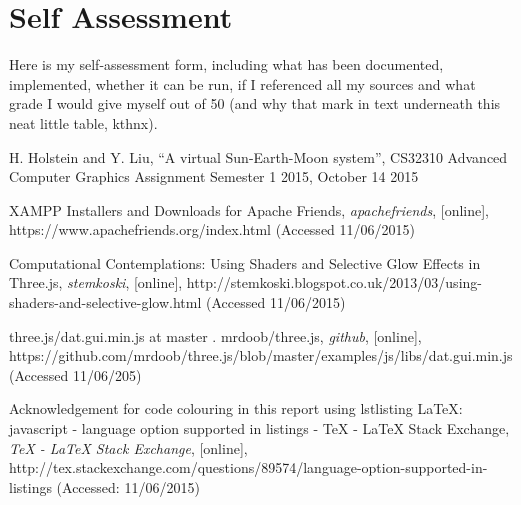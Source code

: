 \documentclass[12pt]{article}
\begin{document}
\clearpage

\section{Self Assessment}
Here is my self-assessment form, including what has been documented, implemented, whether it can be run, if I referenced all my sources and what grade I would give myself out of 50 (and why that mark in text underneath this neat little table, kthnx).


\clearpage


\begin{thebibliography}{1}

 H. Holstein and Y. Liu, ``A virtual Sun-Earth-Moon system'', CS32310 Advanced Computer Graphics Assignment Semester 1 2015, October 14 2015

 XAMPP Installers and Downloads for Apache Friends, {\em apachefriends}, [online], https://www.apachefriends.org/index.html (Accessed 11/06/2015)

 Computational Contemplations: Using Shaders and Selective Glow Effects in Three.js, {\em stemkoski}, [online],
http://stemkoski.blogspot.co.uk/2013/03/using-shaders-and-selective-glow.html (Accessed 11/06/2015)

 three.js/dat.gui.min.js at master . mrdoob/three.js, {\em github}, [online],
https://github.com/mrdoob/three.js/blob/master/examples/js/libs/dat.gui.min.js (Accessed 11/06/205)

  Acknowledgement for code colouring in this report using lstlisting LaTeX: javascript - language option supported in listings - TeX - LaTeX Stack Exchange, {\em TeX - LaTeX Stack Exchange}, [online], http://tex.stackexchange.com/questions/89574/language-option-supported-in-listings (Accessed: 11/06/2015)

\end{thebibliography}
\end{document}

